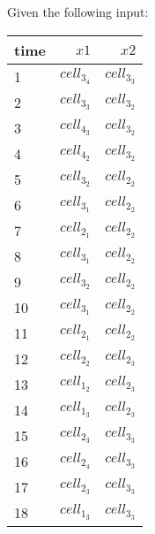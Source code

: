 
Given the following input:
\begin{table}[ht!]
\begin{center}
\begin{tabular}{|l|r|r|}
\hline
time & $\mathit{x}1$& $\mathit{x}2$\\
\hline
1 & $\mathit{cell}_3_4$& $\mathit{cell}_3_3$ \\
2 & $\mathit{cell}_3_3$& $\mathit{cell}_3_2$ \\
3 & $\mathit{cell}_4_3$& $\mathit{cell}_3_2$ \\
4 & $\mathit{cell}_4_2$& $\mathit{cell}_3_2$ \\
5 & $\mathit{cell}_3_2$& $\mathit{cell}_2_2$ \\
6 & $\mathit{cell}_3_1$& $\mathit{cell}_2_2$ \\
7 & $\mathit{cell}_2_1$& $\mathit{cell}_2_2$ \\
8 & $\mathit{cell}_3_1$& $\mathit{cell}_2_2$ \\
9 & $\mathit{cell}_3_2$& $\mathit{cell}_2_2$ \\
10 & $\mathit{cell}_3_1$& $\mathit{cell}_2_2$ \\
11 & $\mathit{cell}_2_1$& $\mathit{cell}_2_2$ \\
12 & $\mathit{cell}_2_2$& $\mathit{cell}_2_3$ \\
13 & $\mathit{cell}_1_2$& $\mathit{cell}_2_3$ \\
14 & $\mathit{cell}_1_3$& $\mathit{cell}_2_3$ \\
15 & $\mathit{cell}_2_3$& $\mathit{cell}_3_3$ \\
16 & $\mathit{cell}_2_4$& $\mathit{cell}_3_3$ \\
17 & $\mathit{cell}_2_3$& $\mathit{cell}_3_3$ \\
18 & $\mathit{cell}_1_3$& $\mathit{cell}_3_3$ \\
\hline
\end{tabular}
\end{center}
\end{table}

